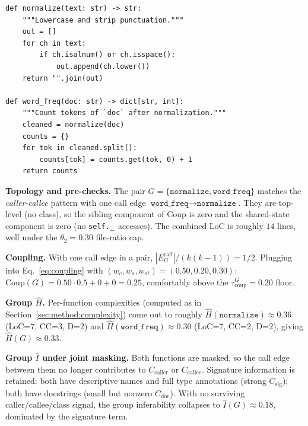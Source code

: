\begin{center}\small
\begin{minipage}{0.82\linewidth}
\begin{verbatim}
def normalize(text: str) -> str:
    """Lowercase and strip punctuation."""
    out = []
    for ch in text:
        if ch.isalnum() or ch.isspace():
            out.append(ch.lower())
    return "".join(out)

def word_freq(doc: str) -> dict[str, int]:
    """Count tokens of `doc` after normalization."""
    cleaned = normalize(doc)
    counts = {}
    for tok in cleaned.split():
        counts[tok] = counts.get(tok, 0) + 1
    return counts
\end{verbatim}
\end{minipage}
\end{center}

\textbf{Topology and pre-checks.} The pair
$G\!=\!\{\texttt{normalize}, \texttt{word\_freq}\}$ matches the
\emph{caller-callee} pattern with one call edge
$\texttt{word\_freq}\!\to\!\texttt{normalize}$. They are top-level
(no class), so the sibling component of $\mathrm{Coup}$ is zero and
the shared-state component is zero (no \texttt{self.\_}~accesses). The
combined LoC is roughly $14$ lines, well under the $\theta_2\!=\!0.30$
file-ratio cap.

\textbf{Coupling.} With one call edge in a pair,
$|E^{\text{call}}_G|/(k(k\!-\!1))=1/2$. Plugging into
Eq.~\ref{eq:coupling} with $(w_c,w_s,w_{st})=(0.50,0.20,0.30)$:
$\mathrm{Coup}(G)=0.50\cdot 0.5+0+0=0.25$, comfortably above the
$\tau^G_{\mathrm{coup}}=0.20$ floor.

\textbf{Group $\hat{H}$.} Per-function complexities (computed as in
Section~\ref{sec:method:complexity}) come out to roughly
$\hat{H}(\texttt{normalize})\!\approx\!0.36$ (LoC=$7$, CC=$3$, D=$2$)
and $\hat{H}(\texttt{word\_freq})\!\approx\!0.30$ (LoC=$7$, CC=$2$,
D=$2$), giving $\hat{H}(G)\!\approx\!0.33$.

\textbf{Group $\hat{I}$ under joint masking.} Both functions are
masked, so the call edge between them no longer contributes to
$C_{\mathrm{caller}}$ or $C_{\mathrm{callee}}$. Signature information
is retained: both have descriptive names and full type annotations
(strong $C_{\mathrm{sig}}$); both have docstrings (small but nonzero
$C_{\mathrm{doc}}$). With no surviving caller/callee/class signal, the
group inferability collapses to $\hat{I}(G)\!\approx\!0.18$, dominated
by the signature term.

